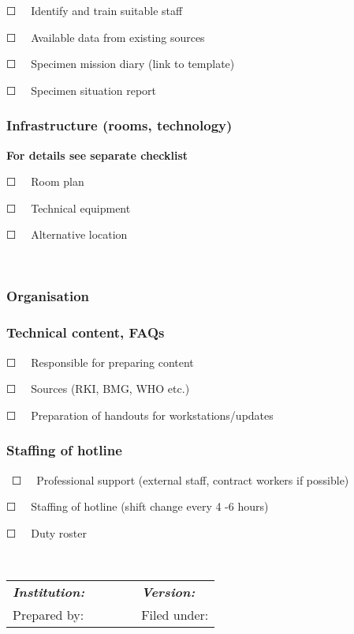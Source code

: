 \documentclass{article}
\begin{document}
☐   Identify and train suitable staff


☐   Available data from existing sources


☐   Specimen mission diary (link to template) 


☐   Specimen situation report


\subsubsection{Infrastructure (rooms, technology)}\label{H5542312}



\textbf{For details see separate checklist}


☐   Room plan


☐   Technical equipment


☐   Alternative location


  


\subsubsection{Organisation  }\label{H5459435}



\subsubsection{Technical content, FAQs}\label{H2920450}



☐   Responsible for preparing content


☐   Sources (RKI, BMG, WHO etc.)


☐   Preparation of handouts for workstations/updates


\subsubsection{Staffing of hotline}\label{H670308}



 ☐   Professional support (external staff, contract workers if possible)


☐   Staffing of hotline (shift change every 4 -6 hours) 


☐   Duty roster


 


\begin{tabu} to \textwidth { |X|X|X| }
\hline



\emph{\textbf{Institution:}}      &  & \emph{\textbf{Version:}}
 \\


Prepared by: &  & Filed under:
 \\
\hline

\end{tabu}

                                                      


 


 


 
\end{document}
